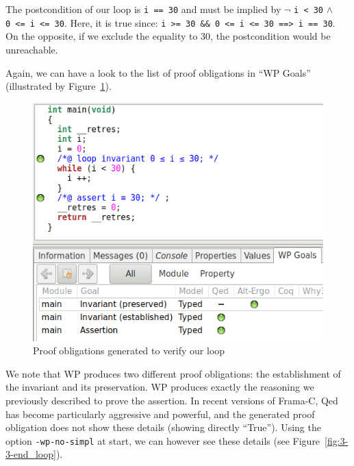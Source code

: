 \documentclass[12pt,francais,]{scrbook}
\begin{document}
The postcondition of our loop is \texttt{i\ ==\ 30} and must be implied
by \(\neg\) \texttt{i\ \textless{}\ 30} \(\wedge\)
\texttt{0\ \textless{}=\ i\ \textless{}=\ 30}. Here, it is true since:
\texttt{i\ \textgreater{}=\ 30\ \&\&\ 0\ \textless{}=\ i\ \textless{}=\ 30\ ==\textgreater{}\ i\ ==\ 30}.
On the opposite, if we exclude the equality to 30, the postcondition
would be unreachable.

Again, we can have a look to the list of proof obligations in ``WP
Goals'' (illustrated by Figure~\ref{fig:3-3-1-i_30-1}).

\begin{figure}[htbp]
\centering
\includegraphics[scale=0.5]{3-3-1-i_30-1.png}
\caption{Proof obligations generated to verify our loop}
\label{fig:3-3-1-i_30-1}
\end{figure}

We note that WP produces two different proof obligations: the
establishment of the invariant and its preservation. WP produces exactly
the reasoning we previously described to prove the assertion. In recent
versions of Frama-C, Qed has become particularly aggressive and
powerful, and the generated proof obligation does not show these details
(showing directly ``True''). Using the option \texttt{-wp-no-simpl} at
start, we can however see these details (see Figure~\ref{fig:3-3-end_loop}).
\end{document}
